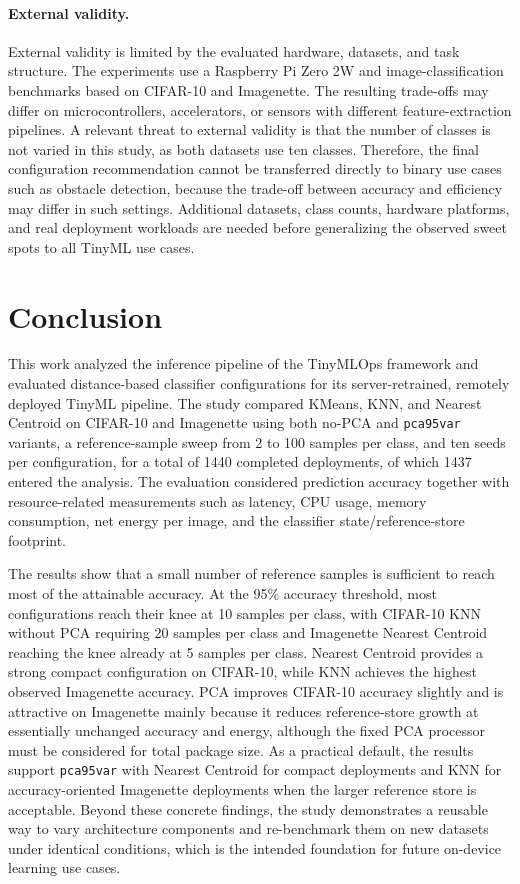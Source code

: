 \documentclass[sigconf,review,nonacm]{acmart}
\begin{document}
\paragraph{External validity.}
External validity is limited by the evaluated hardware, datasets, and task structure.
The experiments use a Raspberry Pi Zero 2W and image-classification benchmarks based on CIFAR-10 and Imagenette. The resulting trade-offs may differ on microcontrollers, accelerators, or sensors with different feature-extraction pipelines.
A relevant threat to external validity is that the number of classes is not varied in this study, as both datasets use ten classes.
Therefore, the final configuration recommendation cannot be transferred directly to binary use cases such as obstacle detection, because the trade-off between accuracy and efficiency may differ in such settings.
Additional datasets, class counts, hardware platforms, and real deployment workloads are needed before generalizing the observed sweet spots to all TinyML use cases.

\section{Conclusion}
\label{sec:conclusion}
This work analyzed the inference pipeline of the TinyMLOps framework and evaluated distance-based classifier configurations for its server-retrained, remotely deployed TinyML pipeline.
The study compared KMeans, KNN, and Nearest Centroid on CIFAR-10 and Imagenette using both no-PCA and \texttt{pca95var} variants, a reference-sample sweep from 2 to 100 samples per class, and ten seeds per configuration, for a total of 1440 completed deployments, of which 1437 entered the analysis.
The evaluation considered prediction accuracy together with resource-related measurements such as latency, CPU usage, memory consumption, net energy per image, and the classifier state/reference-store footprint.

The results show that a small number of reference samples is sufficient to reach most of the attainable accuracy.
At the 95\% accuracy threshold, most configurations reach their knee at 10 samples per class, with CIFAR-10 KNN without PCA requiring 20 samples per class and Imagenette Nearest Centroid reaching the knee already at 5 samples per class.
Nearest Centroid provides a strong compact configuration on CIFAR-10, while KNN achieves the highest observed Imagenette accuracy.
PCA improves CIFAR-10 accuracy slightly and is attractive on Imagenette mainly because it reduces reference-store growth at essentially unchanged accuracy and energy, although the fixed PCA processor must be considered for total package size.
As a practical default, the results support \texttt{pca95var} with Nearest Centroid for compact deployments and KNN for accuracy-oriented Imagenette deployments when the larger reference store is acceptable.
Beyond these concrete findings, the study demonstrates a reusable way to vary architecture components and re-benchmark them on new datasets under identical conditions, which is the intended foundation for future on-device learning use cases.
\end{document}
